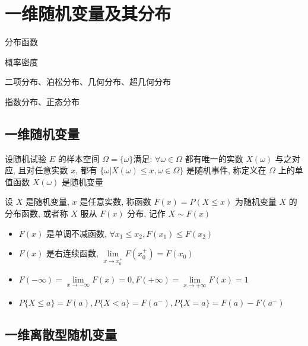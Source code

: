\chapter{一维随机变量及其分布}
\begin{introduction}
	\item 分布函数
	\item 概率密度
	\item 二项分布、泊松分布、几何分布、超几何分布
	\item 指数分布、正态分布
\end{introduction}
\section{一维随机变量}
\begin{definition}[随机变量]
	设随机试验 $E$ 的样本空间 $\Omega=\{\omega\}$满足: 
	$\forall \omega \in\Omega$ 都有唯一的实数 $X(\omega)$ 与之对应, 且对任意实数 $x$, 都有 $\{\omega|X(\omega)\leq x,\omega\in\Omega\}$ 是随机事件,
	称定义在 $\Omega$ 上的单值函数 $X(\omega)$ 是随机变量
\end{definition}
\begin{definition}[分布函数]
	设 $X$ 是随机变量, $x$ 是任意实数, 称函数 $F(x) = P(X\leq x)$ 为随机变量 $X$ 的分布函数, 或者称 $X$ 服从 $F(x)$ 分布, 记作 $X\sim F(x)$
\end{definition}

\begin{corollary}[分布函数性质]
	\begin{itemize}
		\item $F(x)$ 是单调不减函数, $\forall x_{1}\leq x_{2}, F(x_{1})\leq F(x_{2})$
		\item $F(x)$ 是右连续函数, $\lim\limits_{x\to x_{0}^{+}}F(x_{0}^{+}) = F(x_{0})$
		\item $F(-\infty) = \lim\limits_{x\to -\infty}F(x) = 0, F(+\infty) = \lim\limits_{x\to +\infty}F(x) = 1$
		\item $P\{X\leq a\} = F(a), P\{X < a\} = F(a^{-}), P\{X = a\} = F(a) - F(a^{-})$
	\end{itemize}
\end{corollary}

\section{一维离散型随机变量}

